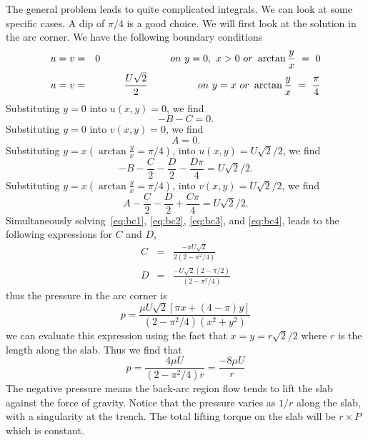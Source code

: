 \documentclass[12pt,twoside]{article}
\begin{document}
The general problem leads to quite complicated integrals.  We can look at some
specific cases.  A dip of $\pi/4$ is a good choice.   We will first look at the
solution in the arc corner. We have the following boundary conditions
\begin{eqnarray}
u=v  & = & 0 ~~~~~~~~~~~~~~~~~~~~~on~y=0,~x>0~or~\arctan \frac{y}{x}~=~0 \\
u=v  & = & {U\sqrt{2}\over 2}~~~~~~~~~~~~~~~on~y=x~or~\arctan
\frac{y}{x}~=~\frac{\pi}{4} 
\end{eqnarray}
Substituting $y=0$ into $u(x,y) = 0$, we find
\begin{equation}
-B -C = 0. \label{eq:bc1}
\end{equation}
Substituting $y=0$ into $v(x,y) = 0$, we find
\begin{equation}
A=0. \label{eq:bc2}
\end{equation}
Substituting $y=x (\arctan\frac{y}{x} = \pi/4)$, into $u(x,y) = U\sqrt{2}/2$, we
find
\begin{equation}
-B - \frac{C}{2} -\frac{D}{2} -\frac{D\pi}{4} =  U\sqrt{2}/2. \label{eq:bc3}
\end{equation}
Substituting $y=x (\arctan\frac{y}{x} = \pi/4)$, into $v(x,y) = U\sqrt{2}/2$, we
find
\begin{equation} 
A - \frac{C}{2} -\frac{D}{2} + \frac{C\pi}{4} =  U\sqrt{2}/2.
\label{eq:bc4}
\end{equation}
Simultaneously solving~\ref{eq:bc1}, \ref{eq:bc2}, \ref{eq:bc3}, and
\ref{eq:bc4}, leads to the following expressions for
$C$ and $D$,
\begin{eqnarray}
C & = & \frac{-\pi U\sqrt{2}}{2(2-\pi^2/4)} \\
D & = & \frac{-U\sqrt{2}(2-\pi/2)}{(2-\pi^2/4)}
\end{eqnarray}
thus the pressure in the arc corner is
\begin{equation}
p = \frac{\mu U \sqrt{2} \left [ \pi x + (4-\pi)y \right]}{(2-\pi^2/4)(x^2+y^2)}
\end{equation}
we can evaluate this expression using the fact that $x=y=r\sqrt{2}/2$ where $r$
is the length along the slab.   Thus we find that 
\begin{equation}
p = \frac{4\mu U}{(2-\pi^2/4)r} = \frac{-8\mu U}{r}
\end{equation}
The negative pressure means the back-arc region flow tends to lift the slab
against the force of gravity.   Notice that the pressure varies as $1/r$ along
the slab, with a singularity at the trench.  The total lifting torque on the
slab will be $r\times P$ which is constant.
\end{document}
